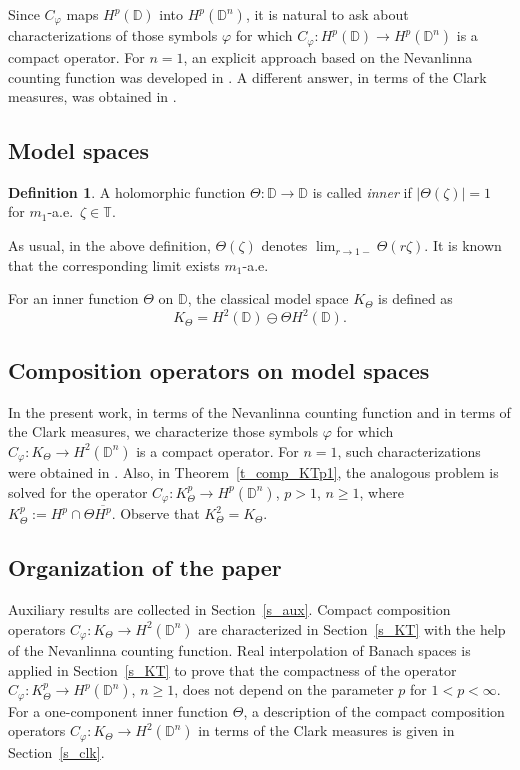 \documentclass{amsart}
\numberwithin{equation}{section}
\theoremstyle{definition}
\newtheorem{definition}[theorem]{Definition}
\newcommand{\diin}{\Theta}
\newcommand{\za}{\zeta}
\newcommand{\ph}{\varphi}
\newcommand{\cph}{C_\varphi}
\newcommand{\Dbb}{\mathbb D}
\newcommand{\Tbb}{\mathbb T}
\newcommand{\dn}{\mathbb{D}^n}
\begin{document}
Since $\cph$ maps $H^p(\Dbb)$ into $H^p(\dn)$, it is natural to ask about characterizations
of those symbols $\ph$ for which
$\cph: H^p(\Dbb)\to H^p(\dn)$ is a compact operator.
For $n=1$, an explicit approach based on the Nevanlinna counting function
was developed in \cite{ShJoel87}.
A different answer, in terms of the Clark measures, was obtained in  \cite{CM97}.

\subsection{Model spaces}
\begin{definition}\label{d_inner}
A holomorphic function
 $\diin:\Dbb \to \Dbb$ is called \textsl{inner} if
$|\diin(\za)|=1$ for $m_1$-a.e.\ $\za\in\Tbb$.
\end{definition}

As usual, in the above definition, $\diin(\za)$ denotes
$\lim_{r\to 1-} \diin(r\za)$.
It is known that the corresponding limit exists $m_1$-a.e.


For an inner function $\diin$ on $\Dbb$, the classical model space $K_\diin$ is defined as
\[
K_\diin = H^2(\Dbb)\ominus \diin H^2(\Dbb).
\]

\subsection{Composition operators on model spaces}
In the present work,
in terms of the Nevanlinna counting function and in terms of the Clark measures,
we characterize those symbols $\ph$ for which
$\cph: K_\diin \to H^2(\dn)$ is a compact operator.
For $n=1$, such characterizations were obtained in \cite{LM13}.
Also, in Theorem~\ref{t_comp_KTp1}, the analogous problem is solved for the operator
$\cph: K_\diin^p \to H^p(\Dbb^n)$, $p>1$, $n\ge 1$,
where $K_\diin^p := H^p \cap \diin \overline{H^p}$.
Observe that $K_\diin^2 = K_\diin$.

\subsection*{Organization of the paper}
Auxiliary results are collected in Section~\ref{s_aux}.
Compact composition operators $\cph: K_\diin \to H^2(\dn)$ are characterized in Section~\ref{s_KT}
with the help of the Nevanlinna counting function.
Real interpolation of Banach spaces is applied in Section~\ref{s_KT}
to prove that the compactness of the operator $\cph: K_\diin^p \to H^p(\dn)$, $n\ge 1$,
does not depend on the parameter $p$ for $1<p<\infty$.
For a one-component inner function $\diin$, a description of the compact composition operators $\cph: K_\diin \to H^2(\dn)$
in terms of the Clark measures is given in Section~\ref{s_clk}.
\end{document}
